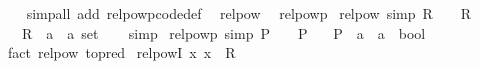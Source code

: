 \begin{isabellebody}
%
\isadelimproof
\ \ %
\endisadelimproof
%
\isatagproof
{}\isamarkupfalse%
\ {\isacharparenleft}{\kern0pt}simp{\isacharunderscore}{\kern0pt}all\ add{\isacharcolon}{\kern0pt}\ relpowp{\isacharunderscore}{\kern0pt}code{\isacharunderscore}{\kern0pt}def{\isacharparenright}{\kern0pt}%
\endisatagproof
{\isafoldproof}%
%
\isadelimproof
\isanewline
%
\endisadelimproof
\isanewline
{}\isamarkupfalse%
\ {\isacharparenleft}{\kern0pt}\ relpow\isanewline
{}\isamarkupfalse%
\ {\isacharparenleft}{\kern0pt}\ relpowp\isanewline
\isanewline
{}\isamarkupfalse%
\ relpow{\isacharunderscore}{\kern0pt}{}\ {\isacharbrackleft}{\kern0pt}simp{\isacharbrackright}{\kern0pt}{\isacharcolon}{\kern0pt}\ {\isachardoublequoteopen}R\ {\isacharcircum}{\kern0pt}{\isacharcircum}{\kern0pt}\ {}\ {\isacharequal}{\kern0pt}\ R{\isachardoublequoteclose}\isanewline
\ \ \ R\ {\isacharcolon}{\kern0pt}{\isacharcolon}{\kern0pt}\ {\isachardoublequoteopen}{\isacharparenleft}{\kern0pt}{\isacharprime}{\kern0pt}a\ {\isasymtimes}\ {\isacharprime}{\kern0pt}a{\isacharparenright}{\kern0pt}\ set{\isachardoublequoteclose}\isanewline
%
\isadelimproof
\ \ %
\endisadelimproof
%
\isatagproof
{}\isamarkupfalse%
\ simp%
\endisatagproof
{\isafoldproof}%
%
\isadelimproof
\isanewline
%
\endisadelimproof
\isanewline
{}\isamarkupfalse%
\ relpowp{\isacharunderscore}{\kern0pt}{}\ {\isacharbrackleft}{\kern0pt}simp{\isacharbrackright}{\kern0pt}{\isacharcolon}{\kern0pt}\ {\isachardoublequoteopen}P\ {\isacharcircum}{\kern0pt}{\isacharcircum}{\kern0pt}\ {}\ {\isacharequal}{\kern0pt}\ P{\isachardoublequoteclose}\isanewline
\ \ \ P\ {\isacharcolon}{\kern0pt}{\isacharcolon}{\kern0pt}\ {\isachardoublequoteopen}{\isacharprime}{\kern0pt}a\ {\isasymRightarrow}\ {\isacharprime}{\kern0pt}a\ {\isasymRightarrow}\ bool{\isachardoublequoteclose}\isanewline
%
\isadelimproof
\ \ %
\endisadelimproof
%
\isatagproof
{}\isamarkupfalse%
\ {\isacharparenleft}{\kern0pt}fact\ relpow{\isacharunderscore}{\kern0pt}{}\ {\isacharbrackleft}{\kern0pt}to{\isacharunderscore}{\kern0pt}pred{\isacharbrackright}{\kern0pt}{\isacharparenright}{\kern0pt}%
\endisatagproof
{\isafoldproof}%
%
\isadelimproof
\isanewline
%
\endisadelimproof
\isanewline
{}\isamarkupfalse%
\ relpow{\isacharunderscore}{\kern0pt}{}{\isacharunderscore}{\kern0pt}I{\isacharcolon}{\kern0pt}\ {\isachardoublequoteopen}{\isacharparenleft}{\kern0pt}x{\isacharcomma}{\kern0pt}\ x{\isacharparenright}{\kern0pt}\ {\isasymin}\ R\ {\isacharcircum}{\kern0pt}{\isacharcircum}{\kern0pt}\ {}{\isachardoublequoteclose}\isanewline

\end{isabellebody}
